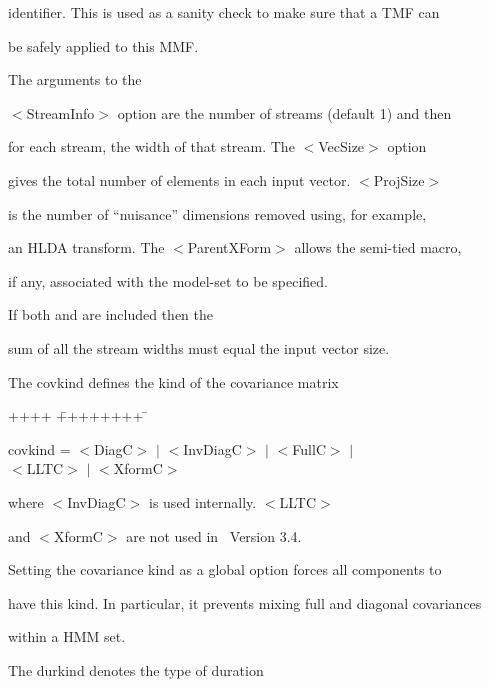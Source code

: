 identifier. This is used as a sanity check to make sure that a TMF can


be safely applied to this MMF.


The arguments to the


{\sf $<$StreamInfo$>$} option are the number of streams (default 1) and then


for each stream, the width of that stream.  The {\sf $<$VecSize$>$} option 


gives the total number of elements in each input vector.  {\sf $<$ProjSize$>$}


is the number of ``nuisance'' dimensions removed using, for example, 


an HLDA transform. The {\sf $<$ParentXForm$>$} allows the semi-tied macro,


if any, associated with the model-set to be specified.


If both  and  are included then the


sum of all the stream widths must equal the input vector size.





The {\sf covkind } defines the kind of the covariance matrix


{\sf


\begin{tabbing}


++++ \= ++++++++ \=  \kill


\>  covkind =\> $<$DiagC$>$ $|$ $<$InvDiagC$>$ $|$ $<$FullC$>$ $|$ \\


\>\>            $<$LLTC$>$ $|$ $<$XformC$>$ 


\end{tabbing}


}


\noindent


where {\sf $<$InvDiagC$>$} is used internally.  {\sf $<$LLTC$>$}


and {\sf $<$XformC$>$} are not used in \HTK\ Version 3.4.


Setting the covariance kind as a global option forces all components to


have this kind.  In particular, it prevents mixing full and diagonal covariances


within a HMM set.





The {\sf durkind} denotes the type of duration


